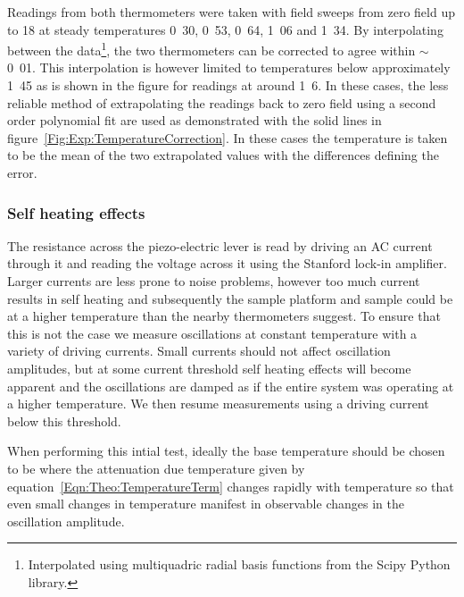 Readings from both thermometers were taken with field sweeps from zero field up to \unit{18}{\tesla} at steady temperatures \unit{0.30}{\kelvin}, \unit{0.53}{\kelvin}, \unit{0.64}{\kelvin}, \unit{1.06}{\kelvin} and \unit{1.34}{\kelvin}. By interpolating between the data\footnote{Interpolated using multiquadric radial basis functions from the Scipy Python library.}, the two thermometers can be corrected to agree within $\sim$\unit{0.01}{\kelvin}. This interpolation is however limited to temperatures below approximately \unit{1.45}{\kelvin} as is shown in the figure for readings at around \unit{1.6}{\kelvin}. In these cases, the less reliable method of extrapolating the readings back to zero field using a second order polynomial fit are used as demonstrated with the solid lines in figure~\ref{Fig:Exp:TemperatureCorrection}. In these cases the temperature is taken to be the mean of the two extrapolated values with the differences defining the error.

\subsubsection{Self heating effects}

The resistance across the piezo-electric lever is read by driving an AC current through it and reading the voltage across it using the Stanford lock-in amplifier. Larger currents are less prone to noise problems, however too much current results in self heating and subsequently the sample platform and sample could be at a higher temperature than the nearby thermometers suggest. To ensure that this is not the case we measure oscillations at constant temperature with a variety of driving currents. Small currents should not affect oscillation amplitudes, but at some current threshold self heating effects will become apparent and the oscillations are damped as if the entire system was operating at a higher temperature. We then resume measurements using a driving current below this threshold.

When performing this intial test, ideally the base temperature should be chosen to be where the attenuation due temperature given by equation~\ref{Eqn:Theo:TemperatureTerm} changes rapidly with temperature so that even small changes in temperature manifest in observable changes in the oscillation amplitude.

